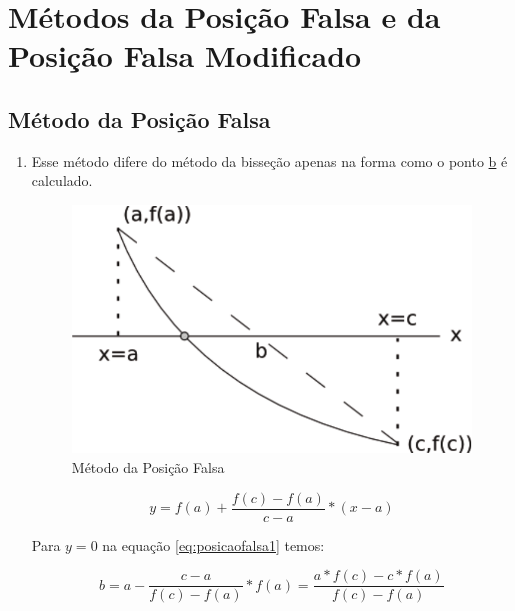 \section{Métodos da Posição Falsa e da Posição Falsa Modificado}

\subsection{Método da Posição Falsa}

\begin{enumerate}
 \item Esse método difere do método da bisseção apenas na forma como o ponto \underline{b} é calculado.

\begin{figure}[htb]
  \setlength{\abovecaptionskip}{20pt}
  \centering
  \includegraphics[scale=0.8]{capitulos/capitulo1/figuras/posicaofalsa1-eps-converted-to.pdf}
  \caption{Método da Posição Falsa}
  \label{fig:posicaofalsa1}
\end{figure}

\begin{equation}
 \label{eq:posicaofalsa1}
 y = f(a) + \frac{f(c) - f(a)}{c - a} \ast (x - a)
\end{equation}

Para $y = 0$ na equação \ref{eq:posicaofalsa1} temos:

\[ \displaystyle b = a - \frac{c - a}{f(c) - f(a)} \ast f(a) = \frac{a \ast f(c) - c \ast f(a)}{f(c) - f(a)} \]


\end{enumerate}
